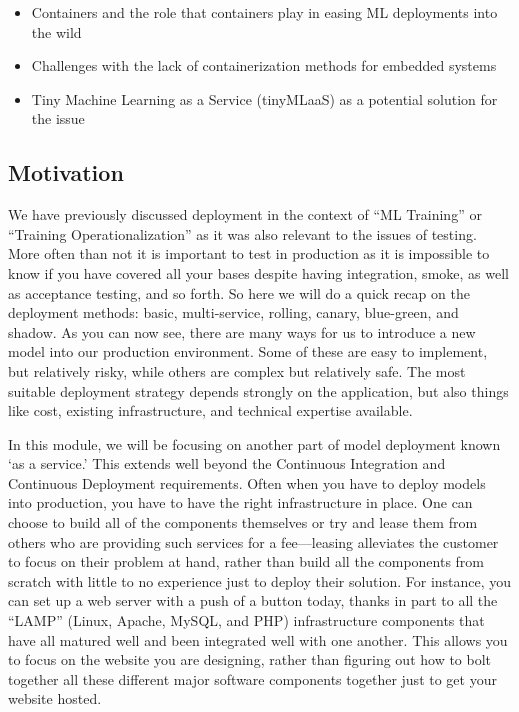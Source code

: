{{{{{    \begin{itemize}
      \item   Containers and the role that containers play in easing ML deployments into the wild
      \item Challenges with the lack of containerization methods for embedded systems
      \item Tiny Machine Learning as a Service (tinyMLaaS) as a potential solution for the issue
   \end{itemize}

    \subsection{Motivation}
    
    We have previously discussed deployment in the context of “ML Training” or “Training Operationalization” as it was also relevant to the issues of testing. More often than not it is important to test in production as it is impossible to know if you have covered all your bases despite having integration, smoke, as well as acceptance testing, and so forth. So here we will do a quick recap on the deployment methods: basic, multi-service, rolling, canary, blue-green, and shadow. As you can now see, there are many ways for us to introduce a new model into our production environment. Some of these are easy to implement, but relatively risky, while others are complex but relatively safe. The most suitable deployment strategy depends strongly on the application, but also things like cost, existing infrastructure, and technical expertise available.
    
    In this module, we will be focusing on another part of model deployment known ‘as a service.’ This extends well beyond the Continuous Integration and Continuous Deployment requirements. Often when you have to deploy models into production, you have to have the right infrastructure in place. One can choose to build all of the components themselves or try and lease them from others who are providing such services for a fee—leasing alleviates the customer to focus on their problem at hand, rather than build all the components from scratch with little to no experience just to deploy their solution. For instance, you can set up a web server with a push of a button today, thanks in part to all the “LAMP” (Linux, Apache, MySQL, and PHP) infrastructure components that have all matured well and been integrated well with one another. This allows you to focus on the website you are designing, rather than figuring out how to bolt together all these different major software components together just to get your website hosted. 
    
}}}}}
